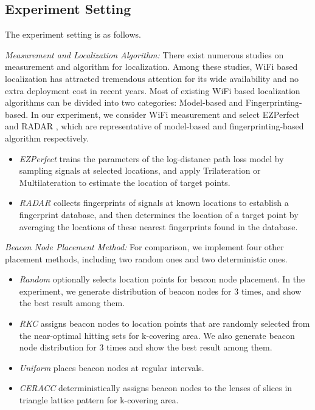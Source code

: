 \documentclass[10pt, conference, letterpaper]{IEEEtran}
\begin{document}
\subsection{Experiment Setting}
The experiment setting is as follows.

\emph{Measurement and Localization Algorithm:} There exist numerous studies on measurement and algorithm for localization. Among these studies, WiFi based localization has attracted tremendous attention for its wide availability and no extra deployment cost in recent years. Most of existing WiFi based localization algorithms can be divided into two categories: Model-based and Fingerprinting-based. In our experiment, we consider WiFi measurement and select EZPerfect \cite{EZPerfect10}\cite{EZPerfect12} and RADAR \cite{RADAR00}, which are representative of model-based and fingerprinting-based algorithm respectively.
\begin{itemize}
  \item \emph{EZPerfect} trains the parameters of the log-distance path loss model by sampling signals at selected locations, and apply Trilateration or Multilateration to estimate the location of target points.
  \item \emph{RADAR} collects fingerprints of signals at known locations to establish a fingerprint database, and then determines the location of a target point by averaging the locations of these nearest fingerprints found in the database.
\end{itemize}

\emph{Beacon Node Placement Method:} For comparison, we implement four other placement methods, including two random ones and two deterministic ones.
\begin{itemize}
  \item \emph{Random} optionally selects location points for beacon node placement. In the experiment, we generate distribution of beacon nodes for 3 times, and show the best result among them.
  \item \emph{RKC} \cite{RKC07} assigns beacon nodes to location points that are randomly selected from the near-optimal hitting sets for k-covering area. We also generate beacon node distribution for 3 times and show the best result among them.
  \item \emph{Uniform} places beacon nodes at regular intervals.
  \item \emph{CERACC} \cite{CERACC12} deterministically assigns beacon nodes to the lenses of slices in triangle lattice pattern for k-covering area.
\end{itemize}
\end{document}
